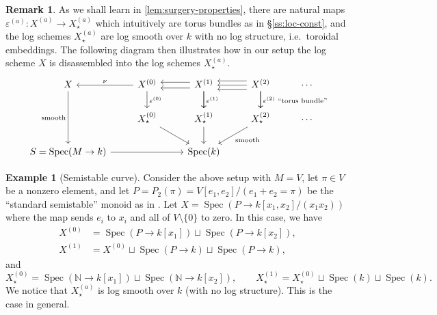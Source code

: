 \documentclass[a4paper,twoside,11pt,reqno]{amsart}
\renewcommand{\mathbb}{\mathds}
\newcommand{\bN}{{\mathbb N}}
\DeclareMathOperator{\Spec}{Spec}
\theoremstyle{definition}
\newtheorem{rmk}[thm]{Remark}
\newtheorem{ex}[thm]{Example}
\numberwithin{equation}{subsection}
\begin{document}
\begin{rmk}
As we shall learn in \cref{lem:surgery-properties}, there are natural maps $\varepsilon^{(a)}\colon X^{(a)}\to X^{(a)}_\star$ which intuitively are torus bundles as in \S\ref{ss:loc-const}, and the log schemes $X^{(a)}_\star$ are log smooth over $k$ with no log structure, i.e.\ toroidal embeddings. The following diagram then illustrates how in our setup the log scheme $X$ is disassembled into the log schemes $X_\star^{(a)}$. 
\[
    \begin{tikzcd}
        X \ar[dd,"\text{smooth}",swap] & X^{(0)} \ar[l,swap,"\nu"] \ar[d,"\varepsilon^{(0)}"] & \ar[l,shift right=0.7ex] \ar[l,shift left=0.7ex] X^{(1)} \ar[d,"\varepsilon^{(1)}"] \ar[d] & \ar[l,shift right=1ex] \ar[l,shift left=1ex] \ar[l] X^{(2)} \ar[d] \ar[d,"\varepsilon^{(2)}\text{ ``torus bundle''}"] & \cdots\\
        & X^{(0)}_\star \ar[dr] & X^{(1)}_\star \ar[d] & X^{(2)}_\star \ar[dl,"\text{smooth}"] & \cdots \\
        S = \Spec(M\to k) \ar[rr] & & \Spec(k)
    \end{tikzcd}
\]
\end{rmk}

\begin{ex}[Semistable curve] \label{ex:semistable-log-curve}
    Consider the above setup with $M=V$, let $\pi\in V$ be a nonzero element, and let $P= P_2(\pi) = V[e_1,e_2]/(e_1+e_2=\pi)$ be the ``standard semistable'' monoid as in \cite[Example~2.4.5]{AHLS-Log}. Let $X = \Spec(P\to k[x_1,x_2]/(x_1x_2))$ where the map sends $e_i$ to $x_i$ and all of $V\setminus \{0\}$ to zero. In this case, we have 
    \begin{align*}
        X^{(0)} & = \Spec(P\to k[x_1]) \sqcup \Spec(P\to k[x_2]), \\
        X^{(1)} & = X^{(0)} \sqcup \Spec(P\to k) \sqcup \Spec(P\to k),
    \end{align*}
    and 
    \[
        X^{(0)}_\star  = \Spec(\bN\to k[x_1]) \sqcup \Spec(\bN\to k[x_2]),
        \qquad 
        X^{(1)}_\star = X^{(0)}_\star \sqcup \Spec(k) \sqcup \Spec(k).
    \]
    We notice that $X^{(a)}_\star$ is log smooth over $k$ (with no log structure). This is the case in general.
\end{ex}
\end{document}
